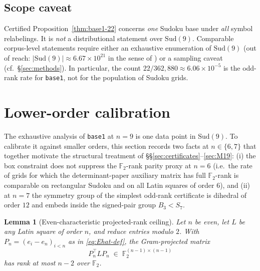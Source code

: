\documentclass[11pt,a4paper]{article}
\newtheorem{lemma}[theorem]{Lemma}
\theoremstyle{definition}
\theoremstyle{remark}
\begin{document}
\subsection{Scope caveat}\label{sec:base1-scope}

Certified Proposition~\ref{thm:base1-22} concerns \emph{one} Sudoku base under
\emph{all} symbol relabelings. It is \emph{not} a distributional
statement over $\mathrm{Sud}(9)$. Comparable corpus-level statements
require either an exhaustive enumeration of $\mathrm{Sud}(9)$ (out of
reach: $|\mathrm{Sud}(9)| \approx 6.67 \times 10^{21}$ in the sense
of \cite{FelgenhauerJarvis06}) or a sampling caveat
(cf.\ \S\ref{sec:methods}). In particular, the count $22 / 362{,}880
\approx 6.06 \times 10^{-5}$ is the odd-rank rate for \texttt{base1},
not for the population of Sudoku grids.

\section{Lower-order calibration}\label{sec:n6n7}

The exhaustive analysis of \texttt{base1} at $n = 9$ is one data point
in $\mathrm{Sud}(9)$. To calibrate it against smaller orders, this
section records two facts at $n \in \{6, 7\}$ that together motivate
the structural treatment of \S\S\ref{sec:certificates}--\ref{sec:M19}:
(i) the box constraint does not suppress the $\mathbb{F}_2$-rank
parity proxy at $n = 6$ (i.e.~the rate of grids for which the
determinant-paper auxiliary matrix has full $\mathbb{F}_2$-rank is
comparable on rectangular Sudoku and on all Latin squares of order $6$), and
(ii) at $n = 7$ the
symmetry group of the simplest odd-rank certificate is dihedral of
order $12$ and embeds inside the signed-pair group $B_3 < S_7$.

\begin{lemma}[Even-characteristic projected-rank ceiling]
\label{lem:F2-even-projection}
Let $n$ be even, let $L$ be any Latin square of order $n$, and reduce
entries modulo $2$. With $P_n=(e_i-e_n)_{i<n}$ as in
\eqref{eq:Ehat-def}, the Gram-projected matrix
\begin{equation*}
   P_n^{\!\top} L P_n \;\in\; \mathbb{F}_2^{(n-1)\times(n-1)}
\end{equation*}
has rank at most $n-2$ over $\mathbb{F}_2$.
\end{lemma}
\end{document}
